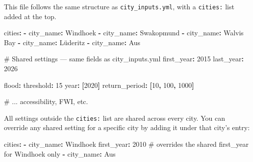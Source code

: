 \documentclass[
  letterpaper,
  DIV=11,
  numbers=noendperiod]{scrreprt}
\newenvironment{Shaded}{\begin{snugshade}}{\end{snugshade}}
\newcommand{\AttributeTok}[1]{\textcolor[rgb]{0.40,0.45,0.13}{#1}}
\newcommand{\CommentTok}[1]{\textcolor[rgb]{0.37,0.37,0.37}{#1}}
\newcommand{\DecValTok}[1]{\textcolor[rgb]{0.68,0.00,0.00}{#1}}
\newcommand{\FunctionTok}[1]{\textcolor[rgb]{0.28,0.35,0.67}{#1}}
\newcommand{\KeywordTok}[1]{\textcolor[rgb]{0.00,0.23,0.31}{\textbf{#1}}}
\begin{document}
This file follows the same structure as \texttt{city\_inputs.yml}, with
a \texttt{cities:} list added at the top.

\begin{Shaded}
\begin{Highlighting}[]
\FunctionTok{cities}\KeywordTok{:}
\AttributeTok{  }\KeywordTok{{-}}\AttributeTok{ }\FunctionTok{city\_name}\KeywordTok{:}\AttributeTok{ Windhoek}
\AttributeTok{  }\KeywordTok{{-}}\AttributeTok{ }\FunctionTok{city\_name}\KeywordTok{:}\AttributeTok{ Swakopmund}
\AttributeTok{  }\KeywordTok{{-}}\AttributeTok{ }\FunctionTok{city\_name}\KeywordTok{:}\AttributeTok{ Walvis Bay}
\AttributeTok{  }\KeywordTok{{-}}\AttributeTok{ }\FunctionTok{city\_name}\KeywordTok{:}\AttributeTok{ Lüderitz}
\AttributeTok{  }\KeywordTok{{-}}\AttributeTok{ }\FunctionTok{city\_name}\KeywordTok{:}\AttributeTok{ Aus}

\CommentTok{\# Shared settings — same fields as city\_inputs.yml}
\FunctionTok{first\_year}\KeywordTok{:}\AttributeTok{ }\DecValTok{2015}
\FunctionTok{last\_year}\KeywordTok{:}\AttributeTok{ }\DecValTok{2026}

\FunctionTok{flood}\KeywordTok{:}
\AttributeTok{  }\FunctionTok{threshold}\KeywordTok{:}\AttributeTok{ }\DecValTok{15}
\AttributeTok{  }\FunctionTok{year}\KeywordTok{:}\AttributeTok{ }\KeywordTok{[}\DecValTok{2020}\KeywordTok{]}
\AttributeTok{  }\FunctionTok{return\_period}\KeywordTok{:}\AttributeTok{ }\KeywordTok{[}\DecValTok{10}\KeywordTok{,}\AttributeTok{ }\DecValTok{100}\KeywordTok{,}\AttributeTok{ }\DecValTok{1000}\KeywordTok{]}

\CommentTok{\# ... accessibility, FWI, etc.}
\end{Highlighting}
\end{Shaded}

All settings outside the \texttt{cities:} list are shared across every
city. You can override any shared setting for a specific city by adding
it under that city's entry:

\begin{Shaded}
\begin{Highlighting}[]
\FunctionTok{cities}\KeywordTok{:}
\AttributeTok{  }\KeywordTok{{-}}\AttributeTok{ }\FunctionTok{city\_name}\KeywordTok{:}\AttributeTok{ Windhoek}
\AttributeTok{    }\FunctionTok{first\_year}\KeywordTok{:}\AttributeTok{ }\DecValTok{2010}\CommentTok{    \# overrides the shared first\_year for Windhoek only}
\AttributeTok{  }\KeywordTok{{-}}\AttributeTok{ }\FunctionTok{city\_name}\KeywordTok{:}\AttributeTok{ Aus}
\end{Highlighting}
\end{Shaded}
\end{document}
